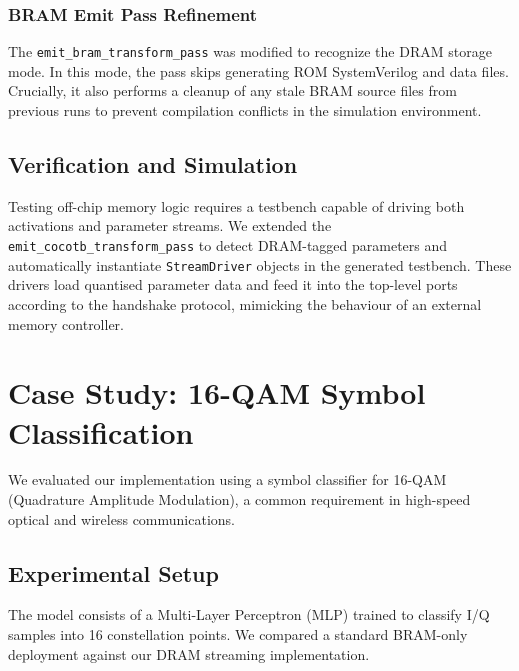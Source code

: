 \documentclass[11pt,a4paper]{article}
\begin{document}
\subsubsection{BRAM Emit Pass Refinement}
The \texttt{emit\_bram\_transform\_pass} was modified to recognize the DRAM
storage mode. In this mode, the pass skips generating ROM SystemVerilog and data
files. Crucially, it also performs a cleanup of any stale BRAM source files
from previous runs to prevent compilation conflicts in the simulation environment.

\subsection{Verification and Simulation}

Testing off-chip memory logic requires a testbench capable of driving both
activations and parameter streams. We extended the \texttt{emit\_cocotb\_transform\_pass}
to detect DRAM-tagged parameters and automatically instantiate
\texttt{StreamDriver} objects in the generated testbench. These drivers load
quantised parameter data and feed it into the top-level ports according to the
handshake protocol, mimicking the behaviour of an external memory controller.

\section{Case Study: 16-QAM Symbol Classification}

We evaluated our implementation using a symbol classifier for 16-QAM (Quadrature
Amplitude Modulation), a common requirement in high-speed optical and wireless
communications.

\subsection{Experimental Setup}
The model consists of a Multi-Layer Perceptron (MLP) trained to classify I/Q
samples into 16 constellation points. We compared a standard BRAM-only deployment
against our DRAM streaming implementation.
\end{document}
